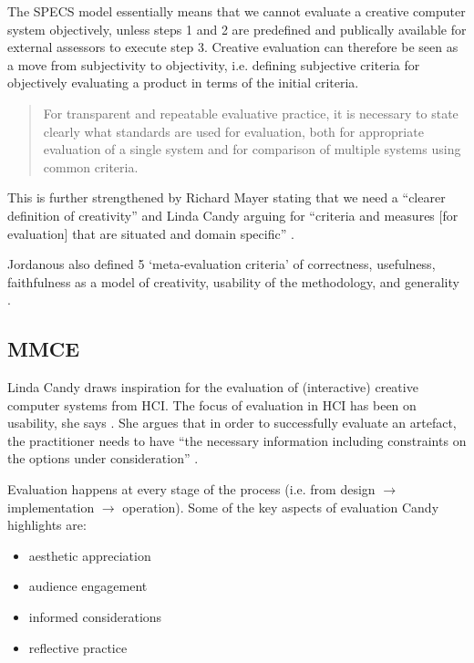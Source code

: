 The \ac{SPECS} model essentially means that we cannot evaluate a creative computer system objectively, unless steps 1 and 2 are predefined and publically available for external assessors to execute step 3. Creative evaluation can therefore be seen as a move from subjectivity to objectivity, i.e. defining subjective criteria for objectively evaluating a product in terms of the initial criteria.

\begin{quotation}
  For transparent and repeatable evaluative practice, it is necessary to state clearly what standards are used for evaluation, both for appropriate evaluation of a single system and for comparison of multiple systems using common criteria. 
\end{quotation}

This is further strengthened by Richard Mayer stating that we need a ``clearer definition of creativity'' \autocite*{Mayer1999} and Linda Candy arguing for ``criteria and measures [for evaluation] that are situated and domain specific'' \autocite*{Candy2012}.

Jordanous also defined 5 `meta-evaluation criteria' of correctness, usefulness, faithfulness as a model of creativity, usability of the methodology, and generality \autocite*{Jordanous2014}.


\subsection{MMCE}
\label{s:mmce}

Linda Candy draws inspiration for the evaluation of (interactive) creative computer systems from \ac{HCI}. The focus of evaluation in \ac{HCI} has been on usability, she says \citeyear[p.23]{Candy2012}. She argues that in order to successfully evaluate an artefact, the practitioner needs to have ``the necessary information including constraints on the options under consideration'' \citeyear[p.7]{Candy2012}.

Evaluation happens at every stage of the process (i.e. from design $\to$ implementation $\to$ operation). Some of the key aspects of evaluation Candy highlights are:

\begin{itemize}
  \item aesthetic appreciation
  \item audience engagement
  \item informed considerations
  \item reflective practice
\end{itemize}

